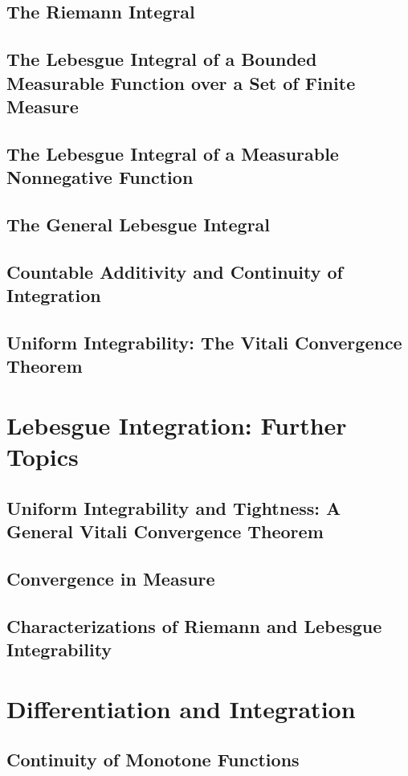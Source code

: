 \documentclass[a4paper,10pt]{book}
\theoremstyle{plain} %
\begin{document}
\section{The Riemann Integral}
\section{The Lebesgue Integral of a Bounded Measurable Function over a Set of Finite Measure}
\section{The Lebesgue Integral of a Measurable Nonnegative Function}
\section{The General Lebesgue Integral}
\section{Countable Additivity and Continuity of Integration}
\section{Uniform Integrability: The Vitali Convergence Theorem}

\chapter{Lebesgue Integration: Further Topics}

\section{Uniform Integrability and Tightness: A General Vitali Convergence Theorem}
\section{Convergence in Measure}
\section{Characterizations of Riemann and Lebesgue Integrability}

\chapter{Differentiation and Integration}

\section{Continuity of Monotone Functions}
\end{document}
